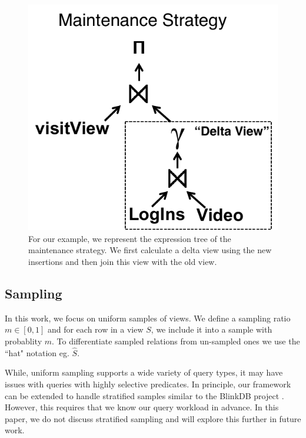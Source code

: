 \begin{figure}[t] \vspace{-2em}
\centering
 \includegraphics[scale=0.30]{figs/example_expression_tree.pdf} \vspace{-.25em}
 \caption{For our example, we represent the expression tree of the maintenance strategy. We first calculate a delta view using the new insertions and then join this view with the old view.\label{exexpr}}\vspace{-1.75em}
\end{figure}

\subsection{Sampling}
In this work, we focus on uniform samples of views.
We define a sampling ratio $m\in [0,1]$ and for each row in a view $S$, we include it into a sample with probablity $m$.
To differentiate sampled relations from un-sampled ones we use the ``hat" notation eg. $\hat{S}$. 

While, uniform sampling supports a wide variety of query types, it may have issues with queries with highly selective predicates.
In principle, our framework can be extended to handle stratified samples similar to the BlinkDB project \cite{AgarwalMPMMS13}.
However, this requires that we know our query workload in advance.  
In this paper, we do not discuss stratified sampling and will explore this further in future work.

